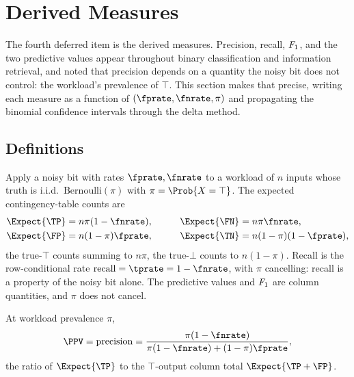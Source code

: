 %

\section{Derived Measures}
\label{sec:derived-measures}

The fourth deferred item is the derived measures. Precision, recall, $F_1$,
and the two predictive values appear throughout binary classification and
information retrieval, and  noted that precision
depends on a quantity the noisy bit does not control: the workload's
prevalence of $\top$. This section makes that precise, writing each measure as
a function of $(\fprate, \fnrate, \pi)$ and propagating the binomial
confidence intervals through the delta method.

\subsection*{Definitions}

Apply a noisy bit with rates $\fprate, \fnrate$ to a workload of $n$ inputs
whose truth is i.i.d.\ $\mathrm{Bernoulli}(\pi)$ with $\pi = \Prob{X = \top}$.
The expected contingency-table counts are
\[
  \begin{aligned}
    \Expect{\TP} &= n\pi(1 - \fnrate), & \qquad \Expect{\FN} &= n\pi\fnrate, \\
    \Expect{\FP} &= n(1 - \pi)\fprate, & \qquad \Expect{\TN} &= n(1 - \pi)(1 - \fprate),
  \end{aligned}
\]
the true-$\top$ counts summing to $n\pi$, the true-$\bot$ counts to $n(1 -
\pi)$. Recall is the row-conditional rate $\Recall = \tprate =
1 - \fnrate$, with $\pi$ cancelling:
recall is a property of the noisy bit alone. The predictive values and $F_1$
are column quantities, and $\pi$ does not cancel.

\begin{definition}
\label{def:ppv}
At workload prevalence $\pi$,
\[
  \PPV = \Precision = \frac{\pi(1 - \fnrate)}{\pi(1 - \fnrate) + (1 - \pi)\fprate},
\]
the ratio of $\Expect{\TP}$ to the $\top$-output column total $\Expect{\TP + \FP}$.
\end{definition}

